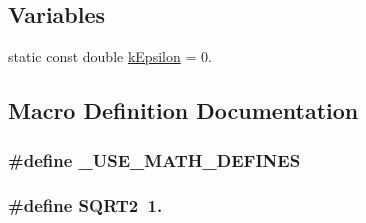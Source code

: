 \subsection*{Variables}
\begin{DoxyCompactItemize}
\item 
static const double \hyperlink{a00220_acf67607e9e6dd5986836b79ce28b80c4}{k\-Epsilon} = 0.
\end{DoxyCompactItemize}


\subsection{Macro Definition Documentation}
\hypertarget{a00220_a525335710b53cb064ca56b936120431e}{
\subsubsection[{\-\_\-\-U\-S\-E\-\_\-\-M\-A\-T\-H\-\_\-\-D\-E\-F\-I\-N\-E\-S}]{\setlength{\rightskip}{0pt plus 5cm}\#define \-\_\-\-U\-S\-E\-\_\-\-M\-A\-T\-H\-\_\-\-D\-E\-F\-I\-N\-E\-S}}\label{a00220_a525335710b53cb064ca56b936120431e}
\hypertarget{a00220_a514396dd60fa0621c83072091fb2a0cd}{
\subsubsection[{S\-Q\-R\-T2}]{\setlength{\rightskip}{0pt plus 5cm}\#define S\-Q\-R\-T2~1.}}\label{a00220_a514396dd60fa0621c83072091fb2a0cd}


